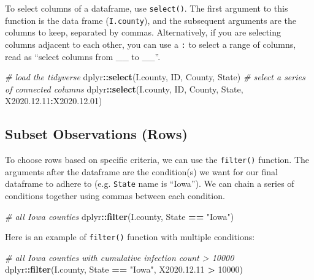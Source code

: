 \documentclass[]{book}
\newenvironment{Shaded}{\begin{snugshade}}{\end{snugshade}}
\newcommand{\KeywordTok}[1]{\textcolor[rgb]{0.13,0.29,0.53}{\textbf{#1}}}
\newcommand{\DecValTok}[1]{\textcolor[rgb]{0.00,0.00,0.81}{#1}}
\newcommand{\FloatTok}[1]{\textcolor[rgb]{0.00,0.00,0.81}{#1}}
\newcommand{\StringTok}[1]{\textcolor[rgb]{0.31,0.60,0.02}{#1}}
\newcommand{\CommentTok}[1]{\textcolor[rgb]{0.56,0.35,0.01}{\textit{#1}}}
\newcommand{\OperatorTok}[1]{\textcolor[rgb]{0.81,0.36,0.00}{\textbf{#1}}}
\newcommand{\NormalTok}[1]{#1}
\begin{document}
To select columns of a dataframe, use \texttt{select()}. The first
argument to this function is the data frame (\texttt{I.county}), and the
subsequent arguments are the columns to keep, separated by commas.
Alternatively, if you are selecting columns adjacent to each other, you
can use a \texttt{:} to select a range of columns, read as ``select
columns from \_\_ to \_\_''.

\begin{Shaded}
\begin{Highlighting}[]
\CommentTok{# load the tidyverse}
\NormalTok{dplyr}\OperatorTok{::}\KeywordTok{select}\NormalTok{(I.county, ID, County, State)}
\CommentTok{# select a series of connected columns}
\NormalTok{dplyr}\OperatorTok{::}\KeywordTok{select}\NormalTok{(I.county, ID, County, State, X2020.}\FloatTok{12.11}\OperatorTok{:}\NormalTok{X2020.}\FloatTok{12.01}\NormalTok{)}
\end{Highlighting}
\end{Shaded}

\subsection{Subset Observations (Rows)}\label{subset-observations-rows}

To choose rows based on specific criteria, we can use the
\texttt{filter()} function. The arguments after the dataframe are the
condition(s) we want for our final dataframe to adhere to (e.g.
\texttt{State} name is ``Iowa''). We can chain a series of conditions
together using commas between each condition.

\begin{Shaded}
\begin{Highlighting}[]
\CommentTok{# all Iowa counties}
\NormalTok{dplyr}\OperatorTok{::}\KeywordTok{filter}\NormalTok{(I.county, State }\OperatorTok{==}\StringTok{ "Iowa"}\NormalTok{)}
\end{Highlighting}
\end{Shaded}

Here is an example of \texttt{filter()} function with multiple
conditions:

\begin{Shaded}
\begin{Highlighting}[]
\CommentTok{# all Iowa counties with cumulative infection count > 10000}
\NormalTok{dplyr}\OperatorTok{::}\KeywordTok{filter}\NormalTok{(I.county, State }\OperatorTok{==}\StringTok{ "Iowa"}\NormalTok{, X2020.}\FloatTok{12.11} \OperatorTok{>}\StringTok{ }\DecValTok{10000}\NormalTok{)}
\end{Highlighting}
\end{Shaded}
\end{document}
